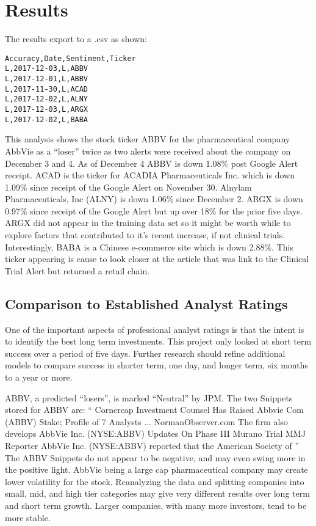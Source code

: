 \documentclass[sigconf]{acmart}
\begin{document}
\section{Results}
The results export to a .csv as shown:
\begin{verbatim}
Accuracy,Date,Sentiment,Ticker
L,2017-12-03,L,ABBV
L,2017-12-01,L,ABBV
L,2017-11-30,L,ACAD
L,2017-12-02,L,ALNY
L,2017-12-03,L,ARGX
L,2017-12-02,L,BABA
\end{verbatim}
This analysis shows the stock ticker ABBV for the pharmaceutical company AbbVie as a ``loser'' twice as two alerts were received about the company on December 3 and 4. As of December 4 ABBV is down 1.08\% post Google Alert receipt. ACAD is the ticker for ACADIA Pharmaceuticals Inc. which is down 1.09\% since receipt of the Google Alert on November 30. Alnylam Pharmaceuticals, Inc (ALNY) is down 1.06\% since December 2. ARGX is down 0.97\% since receipt of the Google Alert but up over 18\% for the prior five days. ARGX did not appear in the training data set so it might be worth while to explore factors that contributed to it's recent increase, if not clinical trials. Interestingly, BABA is a Chinese e-commerce site which is down 2.88\%. This ticker appearing is cause to look closer at the article that was link to the Clinical Trial Alert but returned a retail chain.

\subsection{Comparison to Established Analyst Ratings}
One of the important aspects of professional analyst ratings is that the intent is to identify the best long term investments. This project only looked at short term success over a period of five days. Further research should refine additional models to compare success in shorter term, one day, and longer term, six months to a year or more.

ABBV, a predicted ``losers'', is marked ``Neutral'' by JPM. The two Snippets stored for ABBV are:
``
Cornercap Investment Counsel Has Raised Abbvie Com (ABBV) Stake; Profile of 7 Analysts ... NormanObserver.com The firm also develops
AbbVie Inc. (NYSE:ABBV) Updates On Phase III Murano Trial MMJ Reporter AbbVie Inc. (NYSE:ABBV) reported that the American Society of
''
The ABBV Snippets do not appear to be negative, and may even swing more in the positive light. AbbVie being a large cap pharmaceutical company may create lower volatility for the stock. Reanalyzing the data and splitting companies into small, mid, and high tier categories may give very different results over long term and short term growth. Larger companies, with many more investors, tend to be more stable.
\end{document}
